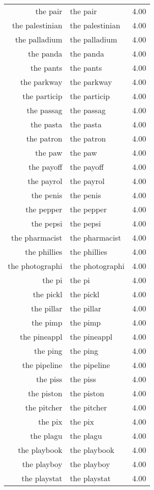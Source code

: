 \begin{table}[ht]
\begin{tabular}{rlr}
  the pair & the pair & 4.00 \\ 
  the palestinian & the palestinian & 4.00 \\ 
  the palladium & the palladium & 4.00 \\ 
  the panda & the panda & 4.00 \\ 
  the pants & the pants & 4.00 \\ 
  the parkway & the parkway & 4.00 \\ 
  the particip & the particip & 4.00 \\ 
  the passag & the passag & 4.00 \\ 
  the pasta & the pasta & 4.00 \\ 
  the patron & the patron & 4.00 \\ 
  the paw & the paw & 4.00 \\ 
  the payoff & the payoff & 4.00 \\ 
  the payrol & the payrol & 4.00 \\ 
  the penis & the penis & 4.00 \\ 
  the pepper & the pepper & 4.00 \\ 
  the pepsi & the pepsi & 4.00 \\ 
  the pharmacist & the pharmacist & 4.00 \\ 
  the phillies & the phillies & 4.00 \\ 
  the photographi & the photographi & 4.00 \\ 
  the pi & the pi & 4.00 \\ 
  the pickl & the pickl & 4.00 \\ 
  the pillar & the pillar & 4.00 \\ 
  the pimp & the pimp & 4.00 \\ 
  the pineappl & the pineappl & 4.00 \\ 
  the ping & the ping & 4.00 \\ 
  the pipeline & the pipeline & 4.00 \\ 
  the piss & the piss & 4.00 \\ 
  the piston & the piston & 4.00 \\ 
  the pitcher & the pitcher & 4.00 \\ 
  the pix & the pix & 4.00 \\ 
  the plagu & the plagu & 4.00 \\ 
  the playbook & the playbook & 4.00 \\ 
  the playboy & the playboy & 4.00 \\ 
  the playstat & the playstat & 4.00 \\ 

\end{tabular}
\end{table}
